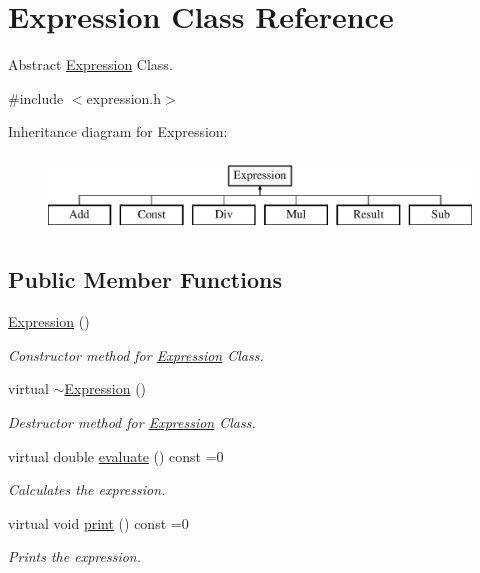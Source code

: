 \hypertarget{class_expression}{}\section{Expression Class Reference}
\label{class_expression}


Abstract \hyperlink{class_expression}{Expression} Class.  




{\ttfamily \#include $<$expression.\+h$>$}

Inheritance diagram for Expression\+:\begin{figure}[H]
\begin{center}
\leavevmode
\includegraphics[height=2.000000cm]{class_expression}
\end{center}
\end{figure}
\subsection*{Public Member Functions}
\begin{DoxyCompactItemize}
\item 
\mbox{\label{class_expression_afcf87716bf0abfe8d414c92529e1564a}} 
\hyperlink{class_expression_afcf87716bf0abfe8d414c92529e1564a}{Expression} ()
\begin{DoxyCompactList}\small\item\em Constructor method for \hyperlink{class_expression}{Expression} Class. \end{DoxyCompactList}\item 
\mbox{\label{class_expression_a3e99570b177da619eeb2c5787cbb148e}} 
virtual \hyperlink{class_expression_a3e99570b177da619eeb2c5787cbb148e}{$\sim$\+Expression} ()
\begin{DoxyCompactList}\small\item\em Destructor method for \hyperlink{class_expression}{Expression} Class. \end{DoxyCompactList}\item 
virtual double \hyperlink{class_expression_a7437adfabeaeb0500d62d10c43a1f853}{evaluate} () const =0
\begin{DoxyCompactList}\small\item\em Calculates the expression. \end{DoxyCompactList}\item 
virtual void \hyperlink{class_expression_a6e05f883ebf77faf344dbaebfc82b3a0}{print} () const =0
\begin{DoxyCompactList}\small\item\em Prints the expression. \end{DoxyCompactList}\end{DoxyCompactItemize}


